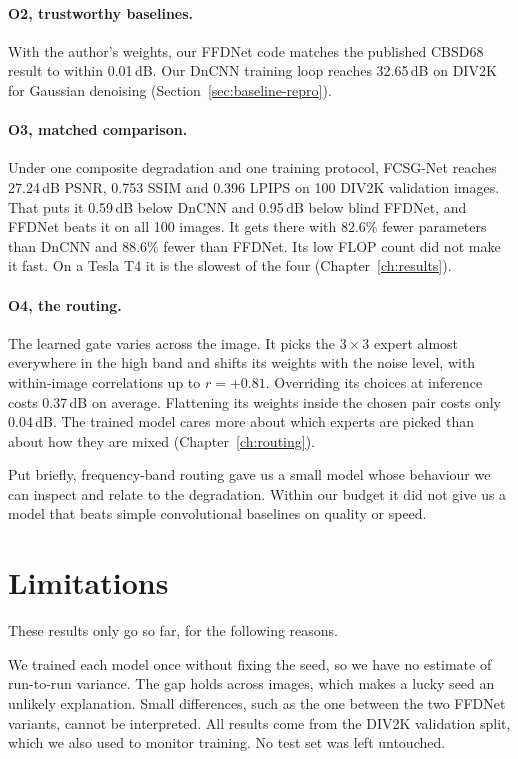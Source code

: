 \documentclass[12pt,a4paper,oneside]{NITR}
\newcommand{\fcsg}{FCSG-Net}
\newcommand{\dB}{\,dB}
\begin{document}
\paragraph{O2, trustworthy baselines.} With the author's weights, our FFDNet
code matches the published CBSD68 result to within 0.01\dB{}. Our DnCNN
training loop reaches 32.65\dB{} on DIV2K for Gaussian denoising
(Section~\ref{sec:baseline-repro}).

\paragraph{O3, matched comparison.} Under one composite degradation and one
training protocol, \fcsg{} reaches 27.24\dB{} PSNR, 0.753 SSIM and 0.396
LPIPS on 100 DIV2K validation images. That puts it 0.59\dB{} below DnCNN and
0.95\dB{} below blind FFDNet, and FFDNet beats it on all 100 images. It gets
there with 82.6\% fewer parameters than DnCNN and 88.6\% fewer than FFDNet.
Its low FLOP count did not make it fast. On a Tesla T4 it is the slowest of
the four (Chapter~\ref{ch:results}).

\paragraph{O4, the routing.} The learned gate varies across the image. It
picks the $3\times3$ expert almost everywhere in the high band and shifts its
weights with the noise level, with within-image correlations up to
$r=+0.81$. Overriding its choices at inference costs 0.37\dB{} on average.
Flattening its weights inside the chosen pair costs only 0.04\dB{}. The
trained model cares more about which experts are picked than about how they
are mixed (Chapter~\ref{ch:routing}).

Put briefly, frequency-band routing gave us a small model whose behaviour we
can inspect and relate to the degradation. Within our budget it did not give
us a model that beats simple convolutional baselines on quality or speed.

\section{Limitations}\label{sec:limitations}

These results only go so far, for the following reasons.

We trained each model once without fixing the seed, so we have no estimate
of run-to-run variance. The gap holds across images, which makes a lucky
seed an unlikely explanation. Small differences, such as the one between the
two FFDNet variants, cannot be interpreted. All results come from the DIV2K
validation split, which we also used to monitor training. No test set was
left untouched.
\end{document}
